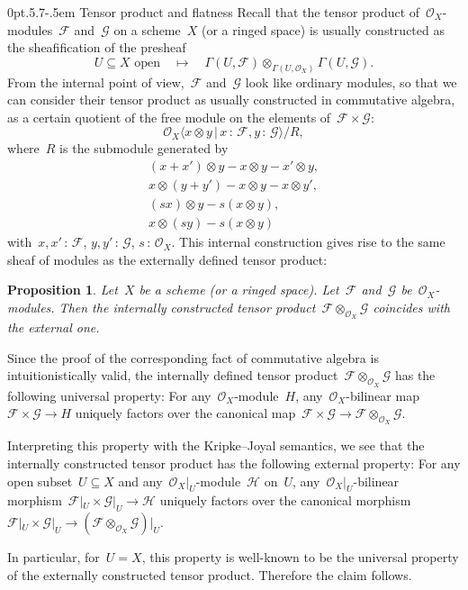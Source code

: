 \documentclass[10pt,reqno,a4paper]{amsbook}
\makeatletter
\theoremstyle{definition}
\theoremstyle{plain}
\newtheorem{prop}[defn]{Proposition}
\theoremstyle{remark}
\newcommand{\F}{\mathcal{F}}
\renewcommand{\G}{\mathcal{G}}
\renewcommand{\H}{\mathcal{H}}
\renewcommand{\O}{\mathcal{O}}
\newcommand{\?}{\,{:}\,}
\renewcommand{\_}{\mathpunct{.}\,}
\renewenvironment{proof}[1][\proofname]{\par
  \pushQED{\qed}%
  \normalfont \topsep6\p@\@plus6\p@\relax
  \trivlist
  \item[\hskip\labelsep
        \itshape
    #1\@addpunct{.}]\ignorespaces
}{%
  \popQED\endtrivlist\@endpefalse
}
\def\subsection{\@startsection{subsection}{2}%
  {0pt}{.5\linespacing\@plus.7\linespacing}{-.5em}%
  {\normalfont\bfseries}}
\makeatother
\begin{document}
\subsection{Tensor product and flatness} Recall that the tensor product
of~$\O_X$-modules~$\F$ and~$\G$ on a scheme~$X$ (or a ringed space) is usually
constructed as the sheafification of the presheaf
\[ \text{$U \subseteq X$ open} \quad\longmapsto\quad \Gamma(U,\F) \otimes_{\Gamma(U,\O_X)}
\Gamma(U,\G). \]
From the internal point of view,~$\F$ and~$\G$ look like ordinary modules, so
that we can consider their tensor product as usually constructed in
commutative algebra, as a certain quotient of the free module on the elements
of~$\F \times \G$:
\[ \O_X\langle x \otimes y \,|\, x\?\F, y\?\G \rangle / R, \]
where~$R$ is the submodule generated by
\begin{gather*}
  (x+x') \otimes y - x \otimes y - x' \otimes y, \\
  x \otimes (y+y') - x \otimes y - x \otimes y', \\
  (sx) \otimes y - s(x \otimes y), \\
  x \otimes (sy) - s(x \otimes y)
\end{gather*}
with~$x,x'\?\F$, $y,y'\?\G$, $s\?\O_X$.
This internal construction gives rise to the same sheaf
of modules as the externally defined tensor product:

\begin{prop}\label{prop:internal-tensor-product}
Let~$X$ be a scheme (or a ringed space). Let~$\F$ and~$\G$
be~$\O_X$-modules. Then the internally constructed tensor product~$\F
\otimes_{\O_X} \G$ coincides with the external one.
\end{prop}
\begin{proof}
Since the proof of the corresponding fact of commutative algebra is
intuitionistically valid, the internally defined tensor product~$\F \otimes_{\O_X} \G$
has the following universal property: For any~$\O_X$-module~$H$,
any~$\O_X$-bilinear map~$\F \times \G \to H$ uniquely factors over the
canonical map~$\F \times \G \to \F \otimes_{\O_X} \G$.

Interpreting this property with the Kripke--Joyal semantics, we see that the
internally constructed tensor product has the following external property:
For any open subset~$U \subseteq X$ and any~$\O_X|_U$-module~$\H$ on~$U$,
any~$\O_X|_U$-bilinear morphism~$\F|_U \times \G|_U \to \H$ uniquely factors over the
canonical morphism~$\F|_U \times \G|_U \to (\F \otimes_{\O_X} \G)|_U$.

In particular, for~$U = X$, this property is well-known to be the universal
property of the externally constructed tensor product. Therefore the
claim follows.
\end{proof}
\end{document}
